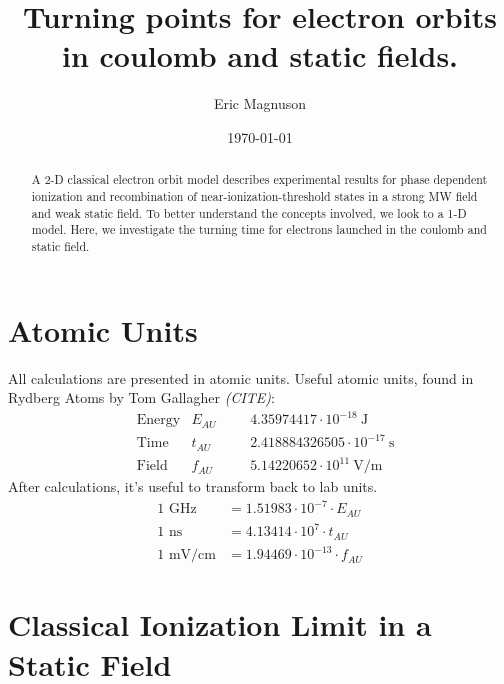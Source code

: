 \documentclass[aps,pra,preprint,groupedaddress]{revtex4-1}
\begin{document}
\title{Turning points for electron orbits in coulomb and static fields.}

\author{Eric Magnuson}
\date{\today}

\begin{abstract}
A 2-D classical electron orbit model describes experimental results for phase dependent ionization and recombination of near-ionization-threshold states in a strong MW field and weak static field. To better understand the concepts involved, we look to a 1-D model. Here, we investigate the turning time for electrons launched in the coulomb and static field.
\end{abstract}

\maketitle

\section{\label{sec:AU} Atomic Units}

All calculations are presented in atomic units. Useful atomic units, found in Rydberg Atoms by Tom Gallagher \emph{(CITE)}:
\begin{align*}
 & \text{Energy} & E_{AU} & & & 4.35974417 \cdot 10^{-18} ~ \text{J} \\
 & \text{Time} & t_{AU} & & & 2.418884326505 \cdot 10^{-17} ~ \text{s} \\
 & \text{Field} & f_{AU} & & & 5.14220652 \cdot 10^{11} ~ \text{V/m}
\end{align*}
After calculations, it's useful to transform back to lab units.
\begin{align*}
\text{1 GHz} & = 1.51983 \cdot 10^{-7} \cdot E_{AU} \\
\text{1 ns} & = 4.13414 \cdot 10^7 \cdot t_{AU} \\
\text{1 mV/cm} & = 1.94469 \cdot 10^{-13} \cdot f_{AU}
\end{align*}

\section{\label{sec:DIL} Classical Ionization Limit in a Static Field}
\end{document}
